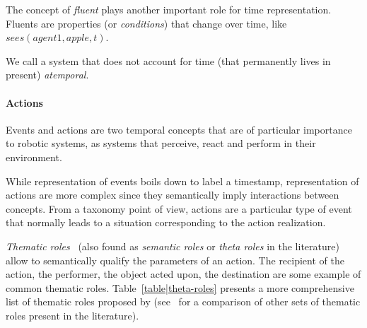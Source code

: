 The concept of \emph{fluent} plays another important role for time
representation. Fluents are properties (or \emph{conditions}) that change over
time, like $sees(agent1, apple, t)$.

We call a system that does not account for time (\ie that permanently lives in
present) \emph{atemporal}.


\paragraph{Actions}

Events and actions are two temporal concepts that are of particular importance to
robotic systems, as systems that perceive, react and perform in their environment.

While representation of events boils down to label a timestamp,
representation of actions are more complex since they semantically imply
interactions between concepts. From a taxonomy point of view, actions are a
particular type of event that normally leads to a situation corresponding to the
action realization.


\emph{Thematic roles}~\cite{Gruber1965} (also found as \emph{semantic roles} or
\emph{theta roles} in the literature) allow to semantically qualify the
parameters of an action. The recipient of the action, the performer, the object
acted upon, the destination are some example of common thematic roles.
Table~\ref{table|theta-roles} presents a more comprehensive list of thematic
roles proposed by \cite{Aarts1997} (see~\cite{Gutierrez2001} for a comparison
of other sets of thematic roles present in the literature).

